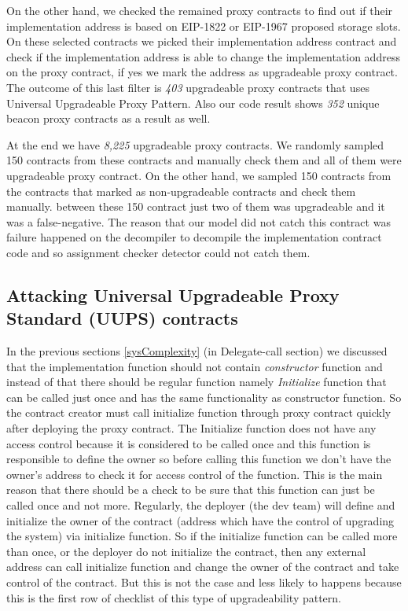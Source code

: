 On the other hand, we checked the remained proxy contracts to find out if their implementation address is based on EIP-1822 or EIP-1967 proposed storage slots. On these selected contracts we picked their implementation address contract and check if the implementation address is able to change the implementation address on the proxy contract, if yes we mark the address as upgradeable proxy contract. The outcome of this last filter is \textit{403} upgradeable proxy contracts that uses Universal Upgradeable Proxy Pattern. Also our code result shows \textit{352} unique beacon proxy contracts as a result as well.

At the end we have \textit{8,225} upgradeable proxy contracts. We randomly sampled 150 contracts from these contracts and manually check them and all of them were upgradeable proxy contract. On the other hand, we sampled 150 contracts from the contracts that marked as non-upgradeable contracts and check them manually. between these 150 contract just two of them was upgradeable and it was a false-negative. The reason that our model did not catch this contract was failure happened on the decompiler to decompile the implementation contract code and so assignment checker detector could not catch them. 

\subsection{Attacking Universal Upgradeable Proxy Standard (UUPS) contracts}
In the previous sections \ref{sysComplexity} (in Delegate-call section) we discussed that the implementation function should not contain \textit{constructor} function and instead of that there should be regular function namely \textit{Initialize} function that can be called just once and has the same functionality as constructor function. So the contract creator must call initialize function through proxy contract quickly after deploying the proxy contract. The Initialize function does not have any access control because it is considered to be called once and this function is responsible to define the owner so before calling this function we don't have the owner's address to check it for access control of the function. This is the main reason that there should be a check to be sure that this function can just be called once and not more. Regularly, the deployer (the dev team) will define and initialize the owner of the contract (address which have the control of upgrading the system) via initialize function. So if the initialize function can be called more than once, or the deployer do not initialize the contract, then any external address can call initialize function and change the owner of the contract and take control of the contract. But this is not the case and less likely to happens because this is the first row of checklist of this type of upgradeability pattern.

